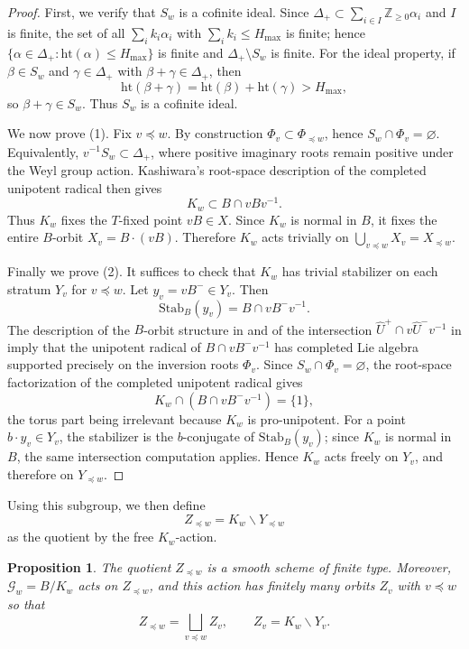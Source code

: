 \documentclass{amsart}
\newtheorem{Prop}[Thm]{Proposition}
\theoremstyle{definition}
\numberwithin{equation}{section}
\begin{document}
\begin{proof}
First, we verify that $S_w$ is a cofinite ideal. Since $\Delta_+\subset \sum_{i\in I}
\mathbb Z_{\geqslant 0}\alpha_i$ and $I$ is finite, the set of all $\sum_i k_i\alpha_i$ with
$\sum_i k_i\leqslant H_{\mathrm{max}}$ is finite; hence
$\{\alpha\in \Delta_+:\mathrm{ht}(\alpha)\leqslant H_{\mathrm{max}}\}$ is finite and
$\Delta_+\setminus S_w$ is finite. For the ideal property, if $\beta \in S_w$ and
$\gamma \in \Delta_+$ with $\beta+\gamma\in \Delta_+$, then
\[
\mathrm{ht}(\beta + \gamma)=\mathrm{ht}(\beta)+\mathrm{ht}(\gamma)>H_{\mathrm{max}},
\]
so $\beta+\gamma\in S_w$. Thus $S_w$ is a cofinite ideal.

We now prove (1). Fix $v\preceq w$. By construction
$\Phi_v\subset \Phi_{\preceq w}$, hence $S_w\cap \Phi_v=\varnothing$. Equivalently,
$v^{-1}S_w\subset\Delta_+$, where positive imaginary roots remain positive under the
Weyl group action. Kashiwara's root-space description of the completed unipotent
radical then gives
\[
K_w\subset B\cap vBv^{-1}.
\]
Thus $K_w$ fixes the $T$-fixed point $vB\in X$. Since $K_w$ is normal in $B$, it fixes
the entire $B$-orbit $X_v=B\cdot(vB)$. Therefore $K_w$ acts trivially on
$\bigcup_{v\preceq w} X_v = X_{\preceq w}$.

Finally we prove (2). It suffices to check that $K_w$ has trivial stabilizer on each
stratum $Y_v$ for $v\preceq w$. Let $y_v=vB^-\in Y_v$. Then
\[
\mathrm{Stab}_B(y_v)=B\cap vB^-v^{-1}.
\]
The description of the $B$-orbit structure in \cite[4.5.7--4.5.9]{K} and of the intersection
$\widehat U^+\cap v\widehat U^-v^{-1}$ in \cite[(4.5.2)]{K} imply that the unipotent radical of
$B\cap vB^-v^{-1}$ has completed Lie algebra supported precisely on the inversion
roots $\Phi_v$. Since $S_w\cap\Phi_v=\varnothing$, the root-space
factorization of the completed unipotent radical gives
\[
K_w \cap (B\cap vB^-v^{-1})=\{1\},
\]
the torus part being irrelevant because $K_w$ is pro-unipotent. For a point
$b\cdot y_v\in Y_v$, the stabilizer is the $b$-conjugate of $\mathrm{Stab}_B(y_v)$; since $K_w$ is
normal in $B$, the same intersection computation applies. Hence $K_w$ acts freely on
$Y_v$, and therefore on $Y_{\preceq w}$.
\end{proof}

Using this subgroup, we then define
\[
Z_{\preceq w}=K_w\backslash Y_{\preceq w}
\]
as the quotient by the free $K_w$-action.

\begin{Prop}\label{prop:Zfinite}
The quotient $Z_{\preceq w}$ is a smooth scheme of finite type. Moreover, $\mathcal G_w=B/K_w$ acts on $Z_{\preceq w}$, and
this action has finitely many orbits $Z_v$ with $v\preceq w$ so that
\[
Z_{\preceq w}=\bigsqcup_{v\preceq w}Z_v,\qquad Z_v=K_w\backslash Y_v .
\]
\end{Prop}
\end{document}
